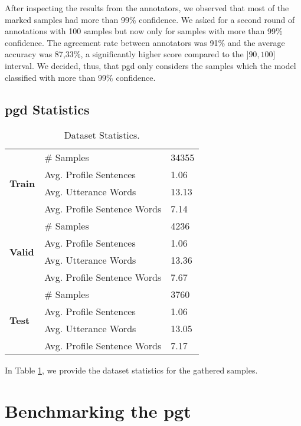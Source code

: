\documentclass[11pt]{article}
\begin{document}
After inspecting the results from the annotators, we observed that most of the marked samples had more than 99\% confidence.
We asked for a second round of annotations with 100 samples but now only for samples with more than 99\% confidence.
The agreement rate between annotators was 91\% and the average accuracy was 87,33\%, a significantly higher score compared to the \(]90, 100]\) interval. We decided, thus, that \gls*{pgd} only considers the samples which the model classified with more than 99\% confidence.






\subsection{\gls*{pgd} Statistics}

\begin{table}
\centering
\begin{tabular}{lll}
\hline
\multirow{4}{*}{\textbf{Train}} & \# Samples & 34355 \\
&Avg. Profile Sentences & 1.06 \\
&Avg. Utterance Words & 13.13 \\
&Avg. Profile Sentence Words & 7.14 \\
\hline
\multirow{4}{*}{\textbf{Valid}} & \# Samples & 4236 \\
&Avg. Profile Sentences & 1.06 \\
&Avg. Utterance Words & 13.36 \\
&Avg. Profile Sentence Words & 7.67 \\
\hline
\multirow{4}{*}{\textbf{Test}} & \# Samples & 3760 \\
&Avg. Profile Sentences & 1.06 \\
&Avg. Utterance Words & 13.05 \\
&Avg. Profile Sentence Words & 7.17 \\
\hline
\end{tabular}
\caption{Dataset Statistics.}
\label{tab:dataset-statistics}
\end{table}

In Table \ref{tab:dataset-statistics}, we provide the dataset statistics for the gathered samples.


\section{Benchmarking the \gls*{pgt}}
\end{document}
